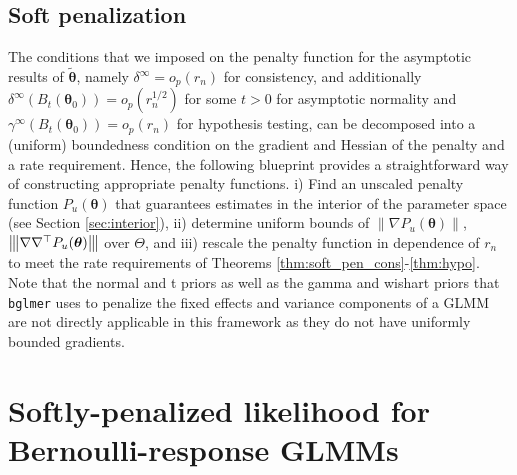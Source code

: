 \documentclass[11pt, a4paper]{article}
\newcommand*{\bb}{\boldsymbol}
\newcommand{\vnorm}[1]{\ensuremath{{\left\| #1 \right\|}}}
\newcommand{\mnorm}[1]{{\left\vert\kern-0.25ex\left\vert\kern-0.25ex\left\vert #1 
		\right\vert\kern-0.25ex\right\vert\kern-0.25ex\right\vert}}
\theoremstyle{example} \newtheorem{example}{Example}[section]
\theoremstyle{theorem} \newtheorem{theorem}{Theorem}[section]
\def\btheta{\bb{\theta}}
\def\btnod{\bb{\theta}_0}
\def\bttilde{\tilde{\bb{\theta}}}
\begin{document}
\subsection{Soft penalization}
\label{sec:soft_pen}
The conditions that we imposed on the penalty function for the asymptotic results of $\bttilde$, namely $\delta^\infty = o_p(r_n)$ for consistency, and additionally $\delta^\infty(B_t(\btnod)) = o_p(r_n^{1/2})$ for some $t>0$ for asymptotic normality and $\gamma^\infty(B_t(\btnod)) = o_p(r_n)$ for hypothesis testing, can be decomposed into a (uniform) boundedness condition on the gradient and Hessian of the penalty and a rate requirement. Hence, the following blueprint provides a straightforward way of constructing appropriate penalty functions. i) Find an unscaled penalty function $P_u(\btheta)$ that guarantees estimates in the interior of the parameter space (see Section \ref{sec:interior}), ii) determine uniform bounds of $\vnorm{\nabla P_u(\btheta)}$, $\mnorm{\nabla \nabla^\top P_u(\btheta)}$ over $\Theta$, and iii) rescale the penalty function in dependence of $r_n$ to meet the rate requirements of Theorems \ref{thm:soft_pen_cons}-\ref{thm:hypo}. Note that the normal and t priors as well as the gamma and wishart priors that \texttt{bglmer} uses to penalize the fixed effects and variance components of a GLMM are not directly applicable in this framework as they do not have uniformly bounded gradients.
\section{Softly-penalized likelihood for Bernoulli-response GLMMs}
\label{sec:glmm_penalties}
\end{document}
